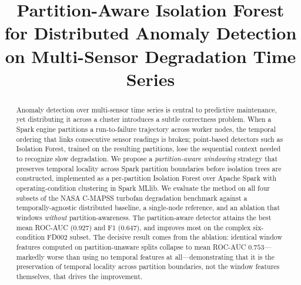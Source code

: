 \documentclass[conference]{IEEEtran}
\begin{document}
\title{Partition-Aware Isolation Forest for Distributed Anomaly Detection on Multi-Sensor Degradation Time Series}

\author{
\and
{}
}

\maketitle

\begin{abstract}
Anomaly detection over multi-sensor time series is central to predictive maintenance, yet distributing it across a cluster introduces a subtle correctness problem. When a Spark engine partitions a run-to-failure trajectory across worker nodes, the temporal ordering that links consecutive sensor readings is broken; point-based detectors such as Isolation Forest, trained on the resulting partitions, lose the sequential context needed to recognize slow degradation. We propose a \emph{partition-aware windowing} strategy that preserves temporal locality across Spark partition boundaries before isolation trees are constructed, implemented as a per-partition Isolation Forest over Apache Spark with operating-condition clustering in Spark MLlib. We evaluate the method on all four subsets of the NASA C-MAPSS turbofan degradation benchmark against a temporally-agnostic distributed baseline, a single-node reference, and an ablation that windows \emph{without} partition-awareness. The partition-aware detector attains the best mean ROC-AUC ($0.927$) and F1 ($0.647$), and improves most on the complex six-condition FD002 subset. The decisive result comes from the ablation: identical window features computed on partition-unaware splits collapse to mean ROC-AUC $0.753$---markedly worse than using no temporal features at all---demonstrating that it is the preservation of temporal locality across partition boundaries, not the window features themselves, that drives the improvement.
\end{abstract}
\end{document}
